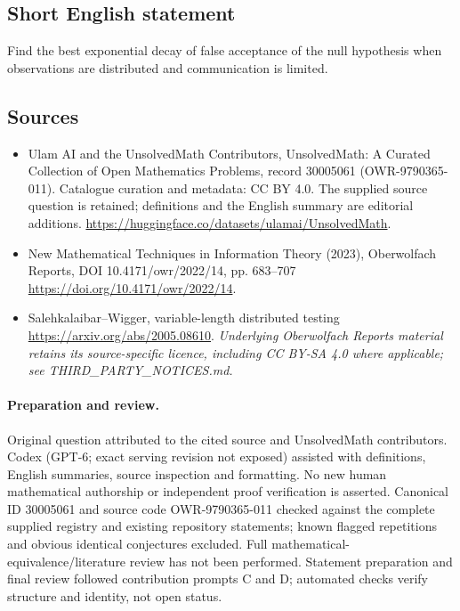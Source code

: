\documentclass[11pt]{article}
\begin{document}
\subsection{Short English statement}
Find the best exponential decay of false acceptance of the null hypothesis when observations are distributed and communication is limited.
\subsection{Sources}
\begin{itemize}
\item[\hypertarget{source:30005061:1}{S1}] Ulam AI and the UnsolvedMath Contributors, UnsolvedMath: A Curated Collection of Open Mathematics Problems, record 30005061 (OWR-9790365-011). Catalogue curation and metadata: CC BY 4.0. The supplied source question is retained; definitions and the English summary are editorial additions.
\url{https://huggingface.co/datasets/ulamai/UnsolvedMath}.
\item[\hypertarget{source:30005061:2}{S2}] New Mathematical Techniques in Information Theory (2023), Oberwolfach Reports, DOI 10.4171/owr/2022/14, pp. 683--707
\url{https://doi.org/10.4171/owr/2022/14}.
\item[\hypertarget{source:30005061:3}{S3}] Salehkalaibar--Wigger, variable-length distributed testing
\url{https://arxiv.org/abs/2005.08610}.
\textit{Underlying Oberwolfach Reports material retains its source-specific licence, including CC BY-SA 4.0 where applicable; see THIRD\_PARTY\_NOTICES.md.}
\end{itemize}
\paragraph{Preparation and review.}
Original question attributed to the cited source and UnsolvedMath contributors. Codex (GPT-6; exact serving revision not exposed) assisted with definitions, English summaries, source inspection and formatting. No new human mathematical authorship or independent proof verification is asserted. Canonical ID 30005061 and source code OWR-9790365-011 checked against the complete supplied registry and existing repository statements; known flagged repetitions and obvious identical conjectures excluded. Full mathematical-equivalence/literature review has not been performed. Statement preparation and final review followed contribution prompts C and D; automated checks verify structure and identity, not open status.
\label{end:30005061}
\end{document}
